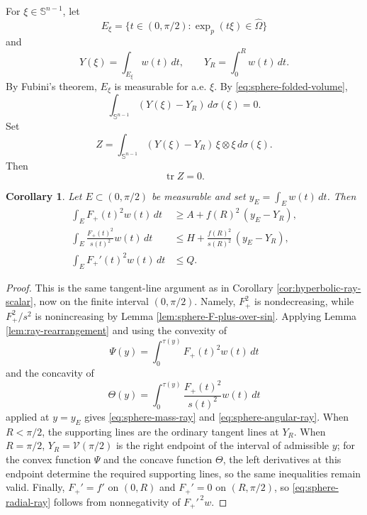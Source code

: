 \documentclass[10pt,a4paper]{amsart}
\newtheorem{corollary}[theorem]{Corollary}
\DeclareMathOperator{\tr}{tr}
\newcommand{\Sn}{\mathbb S}
\begin{document}
For $\xi\in\Sn^{n-1}$, let
$$
        E_\xi=\{t\in(0,\pi/2):\exp_p(t\xi)\in\widehat\Omega\}
$$
and
$$
        Y(\xi)=\int_{E_\xi}w(t)\,dt,
        \qquad
        Y_R=\int_0^R w(t)\,dt.
$$
By Fubini's theorem, $E_\xi$ is measurable for a.e. $\xi$.  By \eqref{eq:sphere-folded-volume},
\begin{equation}\label{eq:sphere-delta-zero}
        \int_{\Sn^{n-1}}(Y(\xi)-Y_R)\,d\sigma(\xi)=0.
\end{equation}
Set
\begin{equation}\label{eq:sphere-Z-def}
        Z=\int_{\Sn^{n-1}}(Y(\xi)-Y_R)\,\xi\otimes\xi\,d\sigma(\xi).
\end{equation}
Then
\begin{equation}\label{eq:sphere-Z-trace-zero}
        \tr Z=0.
\end{equation}

\begin{corollary}\label{cor:sphere-ray-scalar}
Let $E\subset(0,\pi/2)$ be measurable and set $y_E=\int_Ew(t)\,dt$.  Then
\begin{align}
        \int_E F_+(t)^2w(t)\,dt
        &\ge A+f(R)^2\,(y_E-Y_R),
        \label{eq:sphere-mass-ray}\\
        \int_E \frac{F_+(t)^2}{s(t)^2}w(t)\,dt
        &\le H+\frac{f(R)^2}{s(R)^2}\,(y_E-Y_R),
        \label{eq:sphere-angular-ray}\\
        \int_E F_+'(t)^2w(t)\,dt
        &\le Q.
        \label{eq:sphere-radial-ray}
\end{align}
\end{corollary}

\begin{proof}
This is the same tangent-line argument as in Corollary \ref{cor:hyperbolic-ray-scalar}, now on the finite interval $(0,\pi/2)$.  Namely, $F_+^2$ is nondecreasing, while $F_+^2/s^2$ is nonincreasing by Lemma \ref{lem:sphere-F-plus-over-sin}.  Applying Lemma \ref{lem:ray-rearrangement} and using the convexity of
$$
        \Psi(y)=\int_0^{\tau(y)}F_+(t)^2w(t)\,dt
$$
and the concavity of
$$
        \Theta(y)=\int_0^{\tau(y)}\frac{F_+(t)^2}{s(t)^2}w(t)\,dt
$$
applied at $y=y_E$ gives \eqref{eq:sphere-mass-ray} and \eqref{eq:sphere-angular-ray}.  When $R<\pi/2$, the supporting lines are the ordinary tangent lines at $Y_R$.  When $R=\pi/2$, $Y_R=\mathcal V(\pi/2)$ is the right endpoint of the interval of admissible $y$; for the convex function $\Psi$ and the concave function $\Theta$, the left derivatives at this endpoint determine the required supporting lines, so the same inequalities remain valid.  Finally, $F_+'=f'$ on $(0,R)$ and $F_+'=0$ on $(R,\pi/2)$, so \eqref{eq:sphere-radial-ray} follows from nonnegativity of $F_+'^{\,2}w$.
\end{proof}
\end{document}
